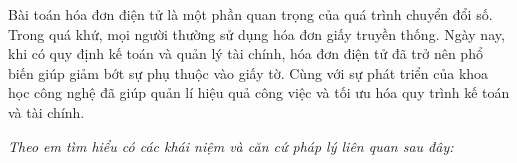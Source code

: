 Bài toán hóa đơn điện tử là một phần quan trọng của quá trình chuyển đổi số. Trong quá khứ, mọi người thường sử dụng hóa đơn giấy truyền thống. Ngày nay, khi có quy định kế toán và quản lý tài chính, hóa đơn điện tử đã trở nên phổ biến giúp giảm bớt sự phụ thuộc vào giấy tờ. Cùng với sự phát triển của khoa học công nghệ đã giúp quản lí hiệu quả công việc và tối ưu hóa quy trình kế toán và tài chính.

\textit{Theo em tìm hiểu có các khái niệm và căn cứ pháp lý liên quan sau đây:}

